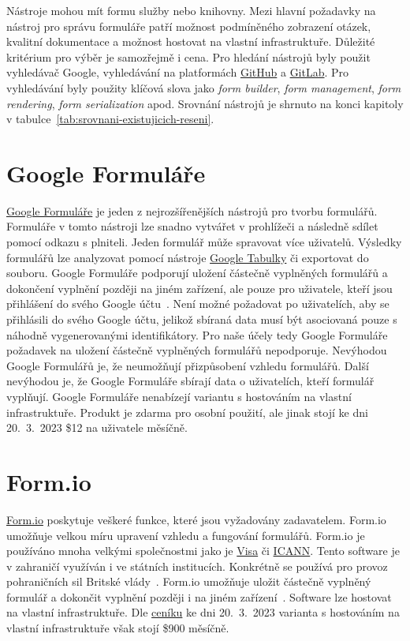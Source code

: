 Nástroje mohou mít formu služby nebo knihovny.
Mezi hlavní požadavky na nástroj pro správu formuláře patří možnost podmíněného zobrazení otázek, kvalitní dokumentace a možnost hostovat na vlastní infrastruktuře.
Důležité kritérium pro výběr je samozřejmě i cena.
Pro hledání nástrojů byly použit vyhledávač Google, vyhledávání na platformách \href{https://github.com/}{GitHub} a \href{https://about.gitlab.com/}{GitLab}.
Pro vyhledávání byly použity klíčová slova jako \textit{form builder}, \textit{form management}, \textit{form rendering}, \textit{form serialization} apod.
Srovnání nástrojů je shrnuto na konci kapitoly v tabulce~\ref{tab:srovnani-existujicich-reseni}.

\section*{Google Formuláře}\label{sec:google-formulare}

\href{https://www.google.com/forms/about/}{Google Formuláře} je jeden z nejrozšířenějších nástrojů pro tvorbu formulářů.
Formuláře v tomto nástroji lze snadno vytvářet v prohlížeči a následně sdílet pomocí odkazu s plniteli.
Jeden formulář může spravovat více uživatelů.
Výsledky formulářů lze analyzovat pomocí nástroje \href{https://www.google.com/intl/cs/sheets/about/}{Google Tabulky} či exportovat do souboru.
Google Formuláře podporují uložení částečně vyplněných formulářů a dokončení vyplnění později na jiném zařízení, ale pouze pro uživatele, kteří jsou přihlášení do svého Google účtu~\cite{save-and-return-google-forms}.
Není možné požadovat po uživatelích, aby se přihlásili do svého Google účtu, jelikož sbíraná data musí být asociovaná pouze s náhodně vygenerovanými identifikátory.
Pro naše účely tedy Google Formuláře požadavek na uložení částečně vyplněných formulářů nepodporuje.
Nevýhodou Google Formulářů je, že neumožňují přizpůsobení vzhledu formulářů.
Další nevýhodou je, že Google Formuláře sbírají data o uživatelích, kteří formulář vyplňují.
Google Formuláře nenabízejí variantu s hostováním na vlastní infrastruktuře.
Produkt je zdarma pro osobní použití, ale jinak stojí ke dni 20.~3.~2023 \$12 na uživatele měsíčně.

\section*{Form.io}\label{sec:formio}

\href{https://form.io/}{Form.io} poskytuje veškeré funkce, které jsou vyžadovány zadavatelem.
Form.io umožňuje velkou míru upravení vzhledu a fungování formulářů.
Form.io je používáno mnoha velkými společnostmi jako je \href{https://www.visa.cz/}{Visa} či \href{https://www.icann.org/}{ICANN}\@.
Tento software je v zahraničí využíván i ve státních institucích.
Konkrétně se používá pro provoz pohraničních sil Britské vlády~\cite{formio-use-camundacon}.
Form.io umožňuje uložit částečně vyplněný formulář a dokončit vyplnění později i na jiném zařízení~\cite{save-and-return-formio}.
Software lze hostovat na vlastní infrastruktuře.
Dle \href{https://form.io/pricing}{ceníku} ke dni 20.~3.~2023 varianta s hostováním na vlastní infrastruktuře však stojí \$900 měsíčně.

